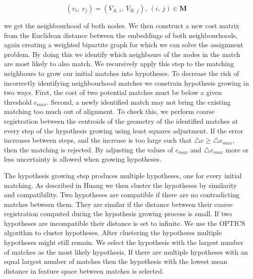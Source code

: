 \begin{equation}
    \label{eq:init_match}
    (v_i,\ v_j) = (V_{A,\ i},\ V_{B,\ j}),\ (i,\ j) \in \mathbf{M}
\end{equation}


we get the neighbourhood of both nodes. We then construct a new cost matrix from the Euclidean distance between the embeddings of both neighbourhoods, again creating a weighted bipartite graph for which we can solve the assignment problem. By doing this we identify which neighbours of the nodes in the match are most likely to also match. We recursively apply this step to the matching neighbours to grow our initial matches into hypotheses. To decrease the risk of incorrectly identifying neighbourhood matches we constrain hypothesis growing in two ways. First, the cost of two potential matches must be below a given threshold \(c_{max}\). Second, a newly identified match may not bring the existing matching too much out of alignment. To check this, we perform coarse registration between the centroids of the geometry of the identified matches at every step of the hypothesis growing using least squares adjustment. If the error increases between steps, and the increase is too large such that \(\triangle e \geq \triangle e_{max} \), then the matching is rejected. By adjusting the values of \(c_{max}\) and \(\triangle e_{max}\) more or less uncertainty is allowed when growing hypotheses.

The hypothesis growing step produces multiple hypotheses, one for every initial matching. As described in Huang \citep{huang_topological_2005} we then cluster the hypotheses by similarity and compatibility. Two hypotheses are compatible if there are no contradicting matches between them. They are similar if the distance between their coarse registration computed during the hypothesis growing process is small. If two hypotheses are incompatible their distance is set to infinite. We use the OPTICS algorithm to cluster hypotheses. After clustering the hypotheses multiple hypotheses might still remain. We select the hypothesis with the largest number of matches as the most likely hypothesis. If there are multiple hypotheses with an equal largest number of matches then the hypothesis with the lowest mean distance in feature space between matches is selected.